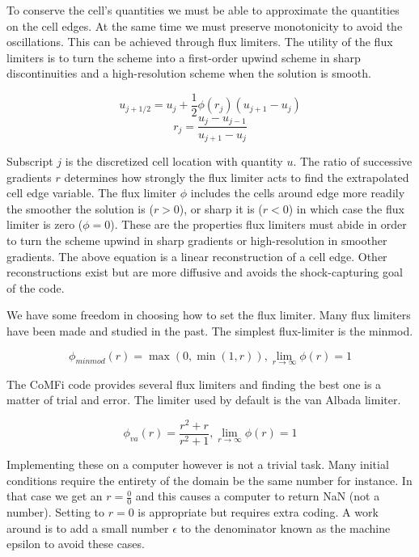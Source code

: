 \documentclass[12pt,upcase]{umlthesis}
\begin{document}
To conserve the cell's quantities we must be able to approximate the quantities on the cell edges. At the same time we must preserve monotonicity to avoid the oscillations. This can be achieved through flux limiters. The utility of the flux limiters is to turn the scheme into a first-order upwind scheme in sharp discontinuities and a high-resolution scheme when the solution is smooth.

\begin{equation}\label{eq:fluxlimiter}
	u_{j+1/2} = u_j + \frac{1}{2} \phi(r_j) (u_{j+1} - u_j)
\end{equation}
\begin{equation}
	r_j = \frac{u_j - u_{j-1}}{u_{j+1} - u_j}
\end{equation}

Subscript $j$ is the discretized cell location with quantity $u$. The ratio of successive gradients $r$ determines how strongly the flux limiter acts to find the extrapolated cell edge variable. The flux limiter $\phi$ includes the cells around edge more readily the smoother the solution is ($r>0$), or sharp it is ($r<0$) in which case the flux limiter is zero ($\phi=0$). These are the properties flux limiters must abide in order to turn the scheme upwind in sharp gradients or high-resolution in smoother gradients. The above equation is a linear reconstruction of a cell edge. Other reconstructions exist but are more diffusive and avoids the shock-capturing goal of the code.

We have some freedom in choosing how to set the flux limiter. Many flux limiters have been made and studied in the past. The simplest flux-limiter is the minmod.

\begin{equation}\label{eq:minmod}
	\phi_{minmod}(r) = \max(0, \min(1, r)), \lim_{r \to \infty} \phi(r) = 1
\end{equation}

The CoMFi code provides several flux limiters and finding the best one is a matter of trial and error. The limiter used by default is the van Albada limiter.

\begin{equation}\label{eq:vanalbada}
	\phi_{va}(r) = \frac{r^2 + r}{r^2 + 1}, \lim_{r \to \infty} \phi(r) = 1
\end{equation}

Implementing these on a computer however is not a trivial task. Many initial conditions require the entirety of the domain be the same number for instance. In that case we get an $r = \frac{0}{0}$ and this causes a computer to return NaN (not a number). Setting to $r=0$ is appropriate but requires extra coding. A work around is to add a small number $\epsilon$ to the denominator known as the machine epsilon to avoid these cases.
\end{document}
